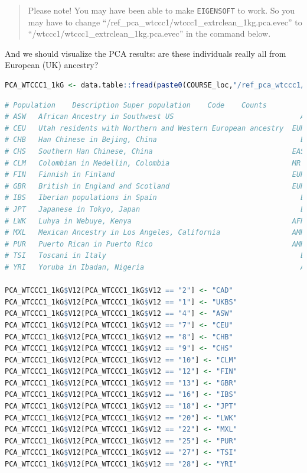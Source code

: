 \documentclass[
]{book}
\newcommand{\passthrough}[1]{#1}
\begin{document}
\begin{quote}
Please note! You may have been able to make \passthrough{\lstinline!EIGENSOFT!} to work. So you may have to change ``/ref\_pca\_wtccc1/wtccc1\_extrclean\_1kg.pca.evec'' to ``/wtccc1/wtccc1\_extrclean\_1kg.pca.evec'' in the command below.
\end{quote}

And we should visualize the PCA results: are these individuals really all from European (UK) ancestry?

\begin{lstlisting}[language=R]
PCA_WTCCC1_1kG <- data.table::fread(paste0(COURSE_loc,"/ref_pca_wtccc1/wtccc1_extrclean_1kg.pca.evec"), header = FALSE, skip = 1)
\end{lstlisting}

\begin{lstlisting}[language=R]
# Population    Description Super population    Code    Counts
# ASW   African Ancestry in Southwest US                              AFR   4     #49A01D
# CEU   Utah residents with Northern and Western European ancestry  EUR 7     #E55738
# CHB   Han Chinese in Bejing, China                                  EAS   8     #9A3480
# CHS   Southern Han Chinese, China                                 EAS 9     #705296
# CLM   Colombian in Medellin, Colombia                             MR  10    #8D5B9A
# FIN   Finnish in Finland                                          EUR 12  #2F8BC9
# GBR   British in England and Scotland                             EUR 13  #1290D9
# IBS   Iberian populations in Spain                                  EUR   16  #1396D8
# JPT   Japanese in Tokyo, Japan                                      EAS   18  #D5267B
# LWK   Luhya in Webuye, Kenya                                      AFR 20  #78B113
# MXL   Mexican Ancestry in Los Angeles, California                 AMR 22  #F59D10
# PUR   Puerto Rican in Puerto Rico                                 AMR 25  #FBB820
# TSI   Toscani in Italy                                              EUR   27  #4C81BF
# YRI   Yoruba in Ibadan, Nigeria                                     AFR   28  #C5D220

PCA_WTCCC1_1kG$V12[PCA_WTCCC1_1kG$V12 == "2"] <- "CAD"
PCA_WTCCC1_1kG$V12[PCA_WTCCC1_1kG$V12 == "1"] <- "UKBS"
PCA_WTCCC1_1kG$V12[PCA_WTCCC1_1kG$V12 == "4"] <- "ASW"
PCA_WTCCC1_1kG$V12[PCA_WTCCC1_1kG$V12 == "7"] <- "CEU"
PCA_WTCCC1_1kG$V12[PCA_WTCCC1_1kG$V12 == "8"] <- "CHB"
PCA_WTCCC1_1kG$V12[PCA_WTCCC1_1kG$V12 == "9"] <- "CHS"
PCA_WTCCC1_1kG$V12[PCA_WTCCC1_1kG$V12 == "10"] <- "CLM"
PCA_WTCCC1_1kG$V12[PCA_WTCCC1_1kG$V12 == "12"] <- "FIN"
PCA_WTCCC1_1kG$V12[PCA_WTCCC1_1kG$V12 == "13"] <- "GBR"
PCA_WTCCC1_1kG$V12[PCA_WTCCC1_1kG$V12 == "16"] <- "IBS"
PCA_WTCCC1_1kG$V12[PCA_WTCCC1_1kG$V12 == "18"] <- "JPT"
PCA_WTCCC1_1kG$V12[PCA_WTCCC1_1kG$V12 == "20"] <- "LWK"
PCA_WTCCC1_1kG$V12[PCA_WTCCC1_1kG$V12 == "22"] <- "MXL"
PCA_WTCCC1_1kG$V12[PCA_WTCCC1_1kG$V12 == "25"] <- "PUR"
PCA_WTCCC1_1kG$V12[PCA_WTCCC1_1kG$V12 == "27"] <- "TSI"
PCA_WTCCC1_1kG$V12[PCA_WTCCC1_1kG$V12 == "28"] <- "YRI"
\end{lstlisting}
\end{document}
